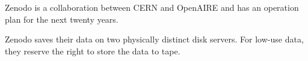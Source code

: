 \documentclass[11pt]{article}
\begin{document}
Zenodo is a collaboration between CERN and OpenAIRE and has an operation plan for the next twenty years.

Zenodo saves their data on two physically distinct disk servers.  For low-use data, they reserve the right to store the data to tape.

\end{document}
